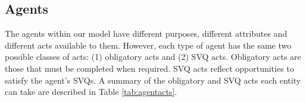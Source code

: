 \documentclass{scspaperproc}
\theoremstyle{scsthe}
\begin{document}

\subsection{Agents} 
The agents within our model have different purposes, different attributes and different acts available to them. However, each type of agent has the same two possible classes of acts: (1) obligatory acts and (2) SVQ acts.  Obligatory acts are those that must be completed when required. SVQ acts reflect opportunities to satisfy the agent's SVQs. A summary of the obligatory and SVQ acts each entity can take are described in Table \ref{tab:agentacts}.
\end{document}
